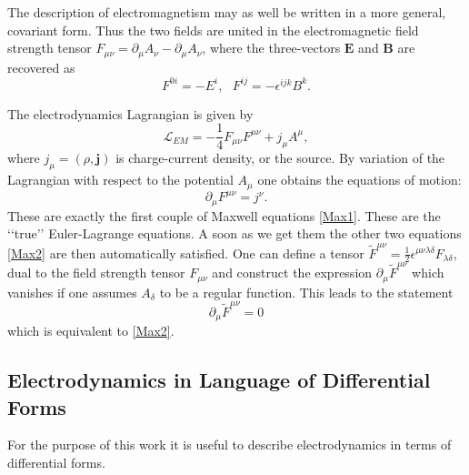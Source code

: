 \documentclass[11pt]{report}
\theoremstyle{plain}
\theoremstyle{definition}
\theoremstyle{remark}
\theoremstyle{remark}
\numberwithin{equation}{section}
\begin{document}
The description of electromagnetism may as well be written in a more general, covariant form. Thus the two fields are united in the electromagnetic field strength tensor $F_{\mu\nu} = \partial_{\mu}A_{\nu} - \partial_{\mu}A_{\nu}$, where the three-vectors $\mathbf{E}$ and $\mathbf{B}$ are recovered as 
%
\begin{equation}
F^{0i} = - E^i, \,\,\,\,     F^{ij} = - \epsilon^{ijk}B^k.
\end{equation}
%

The electrodynamics Lagrangian is given by
%
\begin{equation}
\mathcal{L}_{EM} = -\frac{1}{4} F_{\mu\nu}F^{\mu\nu} + j_{\mu}A^{\mu},
\end{equation}
%
where $j_{\mu} = (\rho, \mathbf{j})$ is charge-current density, or the source.
By variation of the Lagrangian with respect to the potential $A_\mu$ one obtains the equations of motion:
%
\begin{equation}\label{MaxGen}
\partial_{\mu}F^{\mu\nu} = j^{\nu}.
\end{equation}
%
These are exactly the first couple of Maxwell equations \eqref{Max1}. These are the \lq\lq{}true\rq\rq{} Euler-Lagrange equations. A soon as we get them the other two equations \eqref{Max2} are then automatically satisfied. One can define a tensor $\tilde{F}^{\mu\nu} = \frac{1}{2}\epsilon^{\mu\nu\lambda\delta}F_{\lambda\delta}$, dual to the field strength tensor $F_{\mu\nu}$ and construct the expression $\partial_{\mu}\tilde{F}^{\mu\nu}$ which vanishes if one assumes $A_{\delta}$ to be a regular function. %
This leads to the statement
%
\begin{equation}\label{MaxCov2}
\partial_{\mu}\tilde{F}^{\mu\nu}=0
\end{equation}
%
which is equivalent to \eqref{Max2}. 



\subsection{Electrodynamics in Language of Differential Forms}
For the purpose of this work it is useful to describe electrodynamics in terms of differential forms.
 
\end{document}
